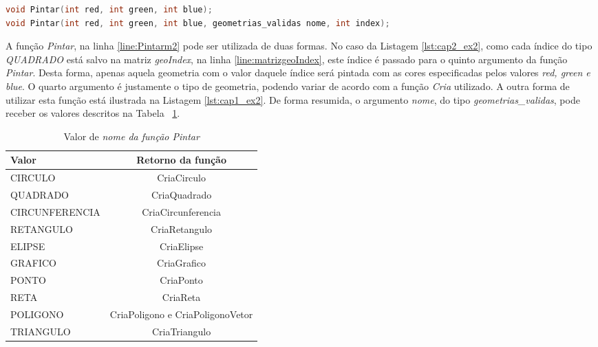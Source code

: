\begin{lstlisting}[label={func:Pintarm2},language=C++]
void Pintar(int red, int green, int blue); 
void Pintar(int red, int green, int blue, geometrias_validas nome, int index);
\end{lstlisting}
A função \emph{Pintar}, na linha \ref{line:Pintarm2} pode ser utilizada de duas formas. No caso da Listagem \ref{lst:cap2_ex2}, como cada índice do tipo \emph{QUADRADO} está salvo na matriz \emph{geoIndex}, na linha \ref{line:matrizgeoIndex}, este índice é passado para o quinto argumento da função \emph{Pintar}. Desta forma, apenas aquela geometria com o valor daquele índice será pintada com as cores especificadas pelos valores \emph{red, green e blue}. O quarto argumento é justamente o tipo de geometria, podendo variar de acordo com a função \emph{Cria} utilizado. A outra forma de utilizar esta função está ilustrada na Listagem \ref{lst:cap1_ex2}.
De forma resumida, o argumento \emph{nome}, do tipo \emph{geometrias\_validas}, pode receber os valores descritos na Tabela ~\ref{tab:PintarM2}.

\begin{table}
  \caption{Valor de \em{nome} da função \em{Pintar}}
  \centering
    \begin{tabular}{lc}
    \hline
    Valor&\bf Retorno da função \\
    \hline
    CIRCULO & CriaCirculo  \\
    QUADRADO  & CriaQuadrado \\
    CIRCUNFERENCIA  & CriaCircunferencia \\
    RETANGULO  & CriaRetangulo \\
    ELIPSE  & CriaElipse \\
    GRAFICO  & CriaGrafico \\
    PONTO  & CriaPonto \\
    RETA  & CriaReta \\
    POLIGONO  & CriaPoligono e CriaPoligonoVetor \\
    TRIANGULO  & CriaTriangulo \\
    \hline
  \end{tabular}
  \label{tab:PintarM2}
\end{table}
